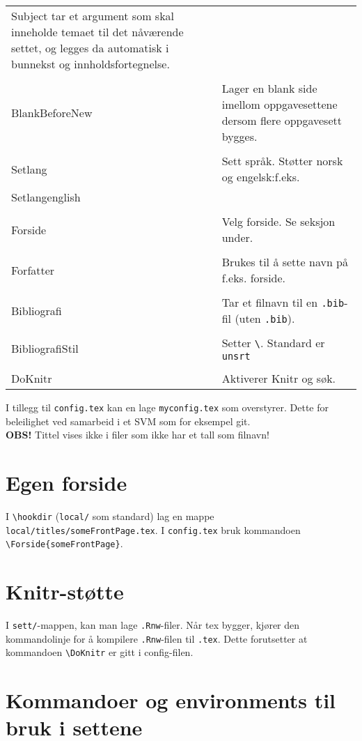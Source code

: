 \documentclass{article}
\begin{document}
\begin{tabularx}{\textwidth}{lX}
												Subject tar et argument som skal inneholde temaet til det nåværende settet, og legges da automatisk i bunnekst og innholdsfortegnelse.\\
	\lstinline{\\BlankBeforeNew}&Lager en blank side imellom oppgavesettene dersom flere oppgavesett bygges.\\
	\lstinline{\\Setlang}&Sett språk. Støtter norsk og engelsk:f.eks. \lstinline{\\Setlang{english}}. Norsk er standard.\\
	\lstinline{\\Forside}&Velg forside. Se seksjon under.\\
	\lstinline{\\Forfatter}&Brukes til å sette navn på f.eks. forside.\\
	\lstinline{\\Bibliografi}&Tar et filnavn til en \lstinline{.bib}-fil (uten \lstinline{.bib}).\\
	\lstinline{\\BibliografiStil}&Setter \lstinline{\}. Standard er \lstinline{unsrt}\\
	\lstinline{\\DoKnitr}&Aktiverer Knitr og søk.
\end{tabularx}
I tillegg til \lstinline{config.tex} kan en lage \lstinline{myconfig.tex} som overstyrer. Dette for beleilighet ved samarbeid i et SVM som for eksempel git.\\
\textbf{OBS!} Tittel vises ikke i filer som ikke har et tall som filnavn!
\clearpage
\section*{Egen forside}
I \lstinline{\hookdir} (\lstinline{local/} som standard) lag en mappe \lstinline{local/titles/someFrontPage.tex}.
I \lstinline{config.tex} bruk kommandoen \lstinline|\Forside{someFrontPage}|.
\section*{Knitr-støtte}
I \lstinline{sett/}-mappen, kan man lage \lstinline{.Rnw}-filer. Når tex bygger, kjører den kommandolinje for å kompilere \lstinline{.Rnw}-filen til \lstinline{.tex}.
Dette forutsetter at kommandoen \lstinline{\DoKnitr} er gitt i config-filen.
\section*{Kommandoer og environments til bruk i settene}
\end{document}
